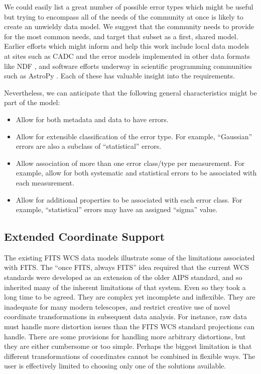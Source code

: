 \documentclass[final,authoryear,5p,times,twocolumn]{elsarticle}
\begin{document}
{{We could easily list a great number of possible error types which
might be useful but trying to encompass all of the needs of the
community at once is likely to create an unwieldy data model. We
suggest that the community needs to provide for the most common needs,
and target that subset as a first, shared model. Earlier efforts which
might inform and help this work include local data models at sites
such as CADC \citep{2012ASPC..461..339D} and the error
models implemented in other data formats like NDF
\citep[although see for example][]{1991STARB...8...19M}, and software
efforts underway in scientific programming communities such as AstroPy
\citep{2013A&A...558A..33A}. Each of these has valuable insight into
the requirements.


Nevertheless, we can anticipate that the following general
characteristics might be part of the model:

\begin{itemize}
\item Allow for both metadata and data to have errors.

\item Allow for extensible classification of the error type. For example,
``Gaussian'' errors are also a subclass of ``statistical'' errors.

\item Allow association of more than one error class/type per
measurement. For example, allow for both systematic and statistical
errors to be associated with each measurement.

\item Allow for additional properties to be associated with each error
class. For example, ``statistical'' errors may have an assigned ``sigma''
value.
\end{itemize}


\subsection{Extended Coordinate Support}
\label{sec:wcs}


The existing FITS WCS data models illustrate some of the limitations
associated with FITS. The ``once FITS, always FITS'' idea required that
the current WCS standards were developed as an extension of the older
AIPS standard, and so inherited many of the inherent limitations of
that system. Even so they took a long time to be agreed. They are
complex yet incomplete and inflexible. They are inadequate for many
modern telescopes, and restrict creative use of novel coordinate
transformations in subsequent data analysis. For instance, raw data
must handle more distortion issues than the FITS WCS standard
projections can handle. There are some provisions for handling more
arbitrary distortions, but they are either cumbersome or too
simple. Perhaps the biggest limitation is that different
transformations of coordinates cannot be combined in flexible
ways. The user is effectively limited to choosing only one of the solutions
available.


}}
\end{document}
